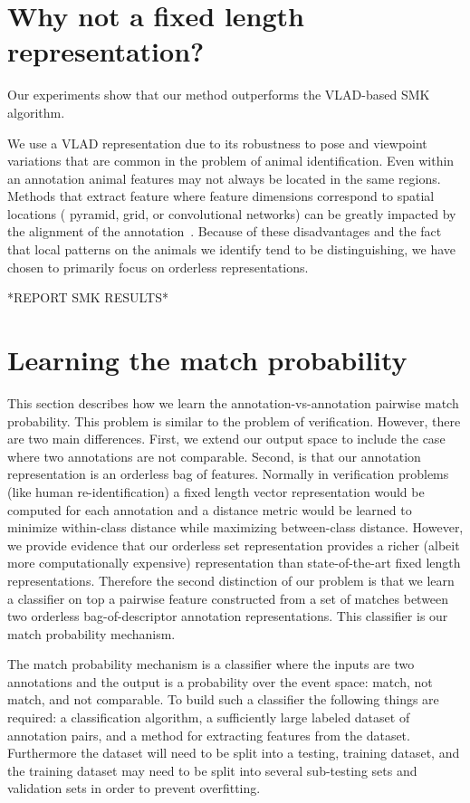 
\section{Why not a fixed length representation?}

Our experiments show that our method outperforms the VLAD-based SMK algorithm.

We use a VLAD representation due to its robustness to pose and viewpoint
  variations that are common in the problem of animal identification.
Even within an annotation animal features may not always be located in the
  same regions.
Methods that extract feature where feature dimensions correspond to spatial
  locations (\ie{} pyramid, grid, or convolutional networks) can be greatly
  impacted by the alignment of the annotation~\cite{wu_viewpoint_2015}.
Because of these disadvantages and the fact that local patterns on the animals
  we identify tend to be distinguishing, we have chosen to primarily focus on
  orderless representations.

*REPORT SMK RESULTS*

\section{Learning the match probability}

This section describes how we learn the annotation-vs-annotation pairwise
  match probability.
This problem is similar to the problem of verification.
However, there are two main differences.
First, we extend our output space to include the case where two annotations
  are not comparable.
Second, is that our annotation representation is an orderless bag of features.
Normally in verification problems (like human re-identification) a fixed
  length vector representation would be computed for each annotation and a
  distance metric would be learned to minimize within-class distance while
  maximizing between-class distance.
However, we provide evidence that our orderless set representation provides a
  richer (albeit more computationally expensive) representation than
  state-of-the-art fixed length representations.
Therefore the second distinction of our problem is that we learn a classifier
  on top a pairwise feature constructed from a set of matches between two
  orderless bag-of-descriptor annotation representations.
This classifier is our match probability mechanism.

The match probability mechanism is a classifier where the inputs are two
  annotations and the output is a probability over the event space:
match, not match, and not comparable.
To build such a classifier the following things are required:
a classification algorithm, a sufficiently large labeled dataset of annotation
  pairs, and a method for extracting features from the dataset.
Furthermore the dataset will need to be split into a testing, training
  dataset, and the training dataset may need to be split into several
  sub-testing sets and validation sets in order to prevent overfitting.



